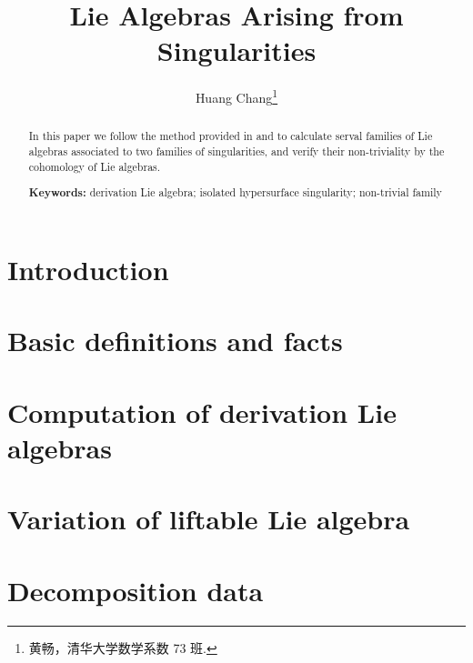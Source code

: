 \documentclass[twoside]{article}
\begin{document}
\title{Lie Algebras Arising from Singularities}
\author{Huang Chang\footnote{黄畅，清华大学数学系数 73 班.}}

\begin{abstract}
	In this paper we follow the method provided in \cite{SY} and \cite{BN}
  to calculate serval families of Lie algebras
  associated to two families of singularities,
  and verify their non-triviality by the cohomology of Lie algebras.
	
  \bigskip

  \noindent
  \textbf{Keywords:}
  derivation Lie algebra; isolated hypersurface singularity; non-trivial family
\end{abstract}

\tableofcontents

\section{Introduction}\label{sec1}


\section{Basic definitions and facts}\label{sec2}


\section{Computation of derivation Lie algebras}\label{sec3}


\section{Variation of liftable Lie algebra}\label{sec4}


\section{Decomposition data}\label{app-C}


\printbibliography       %
\end{document}
